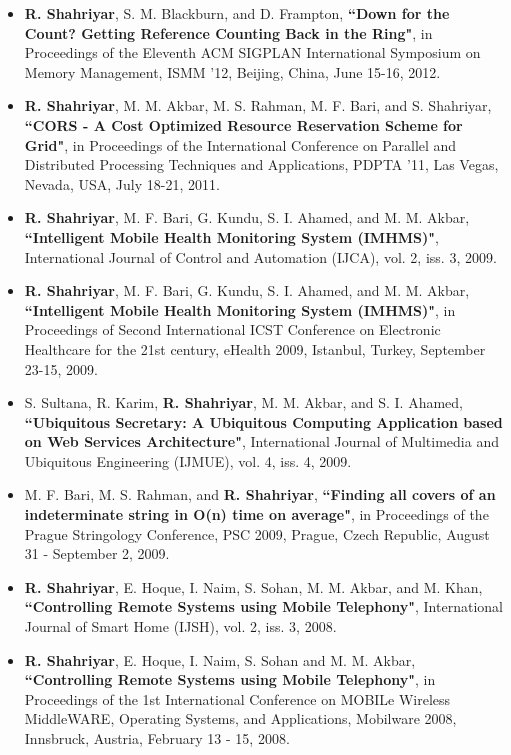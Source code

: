 \documentclass[letterpaper,11pt]{article}
\begin{document}
\begin{itemize}
\item {\bf R. Shahriyar}, S. M. Blackburn, and D. Frampton,  {\color{black} \bf
    ``Down for the Count? Getting Reference Counting Back in the Ring"}, in Proceedings of the Eleventh ACM SIGPLAN International Symposium on Memory Management, ISMM '12, Beijing, China, June 15-16, 2012.

\item {\bf R. Shahriyar}, M. M. Akbar, M. S. Rahman, M. F. Bari, and S. Shahriyar, {\color{black} \bf
    ``CORS - A Cost Optimized Resource Reservation Scheme for Grid"}, in Proceedings of the International Conference on Parallel and Distributed Processing Techniques and Applications, PDPTA '11, Las Vegas, Nevada, USA, July 18-21, 2011. 

\item {\bf R. Shahriyar}, M. F. Bari, G. Kundu, S. I. Ahamed, and M. M. Akbar,  {\color{black} \bf
    ``Intelligent Mobile Health Monitoring System (IMHMS)"}, International Journal of Control and Automation (IJCA), vol. 2, iss. 3, 2009. 
    
\item {\bf R. Shahriyar}, M. F. Bari, G. Kundu, S. I. Ahamed, and M. M. Akbar,  {\color{black} \bf
    ``Intelligent Mobile Health Monitoring System (IMHMS)"}, in Proceedings of Second International ICST Conference on Electronic Healthcare for the 21st century, eHealth 2009, Istanbul, Turkey, September 23-15, 2009.


\item S. Sultana, R. Karim, {\bf R. Shahriyar}, M. M. Akbar, and S. I. Ahamed,  {\color{black} \bf
    ``Ubiquitous Secretary: A Ubiquitous Computing Application based on Web Services Architecture"}, International Journal of Multimedia and Ubiquitous Engineering (IJMUE), vol. 4, iss. 4, 2009. 
    
\item M. F. Bari, M. S. Rahman, and {\bf R. Shahriyar},  {\color{black} \bf
    ``Finding all covers of an indeterminate string in O(n) time on average"}, in Proceedings of the Prague Stringology Conference, PSC 2009, Prague, Czech Republic, August 31 - September 2, 2009. 

\item {\bf R. Shahriyar}, E. Hoque, I. Naim, S. Sohan, M. M. Akbar, and M. Khan,  {\color{black} \bf
    ``Controlling Remote Systems using Mobile Telephony"}, International Journal of Smart Home (IJSH), vol. 2, iss. 3, 2008. 
    
\item {\bf R. Shahriyar}, E. Hoque, I. Naim, S. Sohan and M. M. Akbar, {\color{black} \bf
    ``Controlling Remote Systems using Mobile Telephony"}, in Proceedings of the 1st International Conference on MOBILe Wireless MiddleWARE, Operating Systems, and Applications, Mobilware 2008, Innsbruck, Austria, February 13 - 15, 2008. 


\end{itemize}
\end{document}
